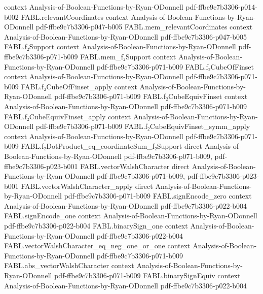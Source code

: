 \begin{theorem}
  {context}
  {Analysis-of-Boolean-Functions-by-Ryan-ODonnell}
  {pdf-ffbe9c7b3306-p014-b002}
\proofstep
  {FABL.relevantCoordinates}
  {context}
  {Analysis-of-Boolean-Functions-by-Ryan-ODonnell}
  {pdf-ffbe9c7b3306-p047-b005}
\proofstep
  {FABL.mem_relevantCoordinates}
  {context}
  {Analysis-of-Boolean-Functions-by-Ryan-ODonnell}
  {pdf-ffbe9c7b3306-p047-b005}
\proofstep
  {FABL.f₂Support}
  {context}
  {Analysis-of-Boolean-Functions-by-Ryan-ODonnell}
  {pdf-ffbe9c7b3306-p071-b009}
\proofstep
  {FABL.mem_f₂Support}
  {context}
  {Analysis-of-Boolean-Functions-by-Ryan-ODonnell}
  {pdf-ffbe9c7b3306-p071-b009}
\proofstep
  {FABL.f₂CubeOfFinset}
  {context}
  {Analysis-of-Boolean-Functions-by-Ryan-ODonnell}
  {pdf-ffbe9c7b3306-p071-b009}
\proofstep
  {FABL.f₂CubeOfFinset_apply}
  {context}
  {Analysis-of-Boolean-Functions-by-Ryan-ODonnell}
  {pdf-ffbe9c7b3306-p071-b009}
\proofstep
  {FABL.f₂CubeEquivFinset}
  {context}
  {Analysis-of-Boolean-Functions-by-Ryan-ODonnell}
  {pdf-ffbe9c7b3306-p071-b009}
\proofstep
  {FABL.f₂CubeEquivFinset_apply}
  {context}
  {Analysis-of-Boolean-Functions-by-Ryan-ODonnell}
  {pdf-ffbe9c7b3306-p071-b009}
\proofstep
  {FABL.f₂CubeEquivFinset_symm_apply}
  {context}
  {Analysis-of-Boolean-Functions-by-Ryan-ODonnell}
  {pdf-ffbe9c7b3306-p071-b009}
\proofstep
  {FABL.f₂DotProduct_eq_coordinateSum_f₂Support}
  {direct}
  {Analysis-of-Boolean-Functions-by-Ryan-ODonnell}
  {pdf-ffbe9c7b3306-p071-b009,
    pdf-ffbe9c7b3306-p023-b001}
\proofstep
  {FABL.vectorWalshCharacter}
  {direct}
  {Analysis-of-Boolean-Functions-by-Ryan-ODonnell}
  {pdf-ffbe9c7b3306-p071-b009,
    pdf-ffbe9c7b3306-p023-b001}
\proofstep
  {FABL.vectorWalshCharacter_apply}
  {direct}
  {Analysis-of-Boolean-Functions-by-Ryan-ODonnell}
  {pdf-ffbe9c7b3306-p071-b009}
\proofstep
  {FABL.signEncode_zero}
  {context}
  {Analysis-of-Boolean-Functions-by-Ryan-ODonnell}
  {pdf-ffbe9c7b3306-p022-b004}
\proofstep
  {FABL.signEncode_one}
  {context}
  {Analysis-of-Boolean-Functions-by-Ryan-ODonnell}
  {pdf-ffbe9c7b3306-p022-b004}
\proofstep
  {FABL.binarySign_one}
  {context}
  {Analysis-of-Boolean-Functions-by-Ryan-ODonnell}
  {pdf-ffbe9c7b3306-p022-b004}
\proofstep
  {FABL.vectorWalshCharacter_eq_neg_one_or_one}
  {context}
  {Analysis-of-Boolean-Functions-by-Ryan-ODonnell}
  {pdf-ffbe9c7b3306-p071-b009}
\proofstep
  {FABL.abs_vectorWalshCharacter}
  {context}
  {Analysis-of-Boolean-Functions-by-Ryan-ODonnell}
  {pdf-ffbe9c7b3306-p071-b009}
\proofstep
  {FABL.binarySignEquiv}
  {context}
  {Analysis-of-Boolean-Functions-by-Ryan-ODonnell}
  {pdf-ffbe9c7b3306-p022-b004}
\proofstep

\end{theorem}
